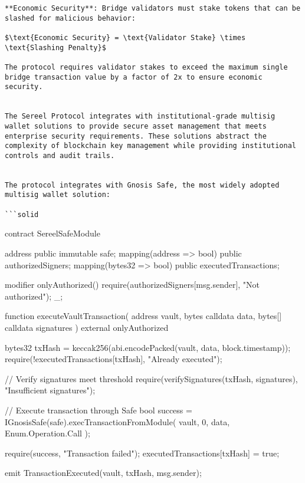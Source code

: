 \documentclass[12pt]{article}
\begin{document}
\begin{lstlisting}
**Economic Security**: Bridge validators must stake tokens that can be slashed for malicious behavior:

$\text{Economic Security} = \text{Validator Stake} \times \text{Slashing Penalty}$

The protocol requires validator stakes to exceed the maximum single bridge transaction value by a factor of 2x to ensure economic security.


The Sereel Protocol integrates with institutional-grade multisig wallet solutions to provide secure asset management that meets enterprise security requirements. These solutions abstract the complexity of blockchain key management while providing institutional controls and audit trails.


The protocol integrates with Gnosis Safe, the most widely adopted multisig wallet solution:

```solid
\end{lstlisting}
contract SereelSafeModule {    address public immutable safe;    mapping(address => bool) public authorizedSigners;    mapping(bytes32 => bool) public executedTransactions;

    modifier onlyAuthorized() {        require(authorizedSigners[msg.sender], "Not authorized");        _;    }

    function executeVaultTransaction(        address vault,        bytes calldata data,        bytes[] calldata signatures    ) external onlyAuthorized {        bytes32 txHash = keccak256(abi.encodePacked(vault, data, block.timestamp));        require(!executedTransactions[txHash], "Already executed");

        // Verify signatures meet threshold        require(verifySignatures(txHash, signatures), "Insufficient signatures");

        // Execute transaction through Safe        bool success = IGnosisSafe(safe).execTransactionFromModule(            vault,            0,            data,            Enum.Operation.Call        );

        require(success, "Transaction failed");        executedTransactions[txHash] = true;

        emit TransactionExecuted(vault, txHash, msg.sender);    }}
\end{document}

